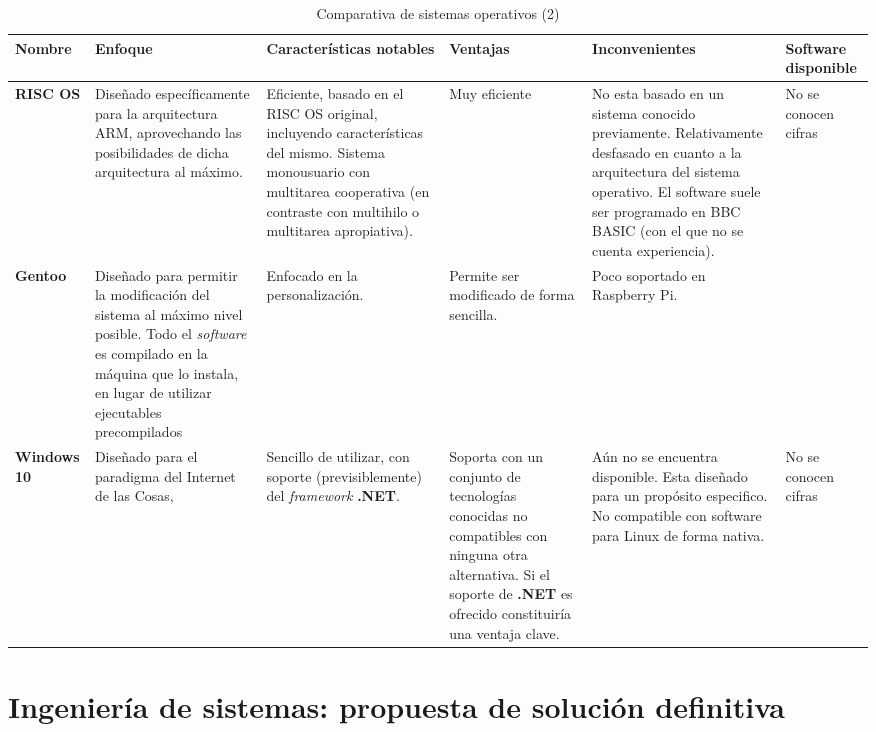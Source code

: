 \begin{landscape}
\begin{table}[h]
\begin{tabular}{|p{2cm}|p{4cm}|p{5cm}|p{3cm}|p{4cm}|p{4cm}|}
\hline
\textbf{Nombre} & \textbf{Enfoque} & \textbf{Características notables} & \textbf{Ventajas} & \textbf{Inconvenientes} & \textbf{Software disponible}\\ \hline

\textbf{RISC OS} & Diseñado específicamente para la arquitectura ARM, aprovechando las posibilidades de dicha arquitectura al máximo. & Eficiente, basado en el RISC OS original, incluyendo características del mismo. Sistema monousuario con multitarea cooperativa (en contraste con multihilo o multitarea apropiativa). & Muy eficiente & No esta basado en un sistema conocido previamente. Relativamente desfasado en cuanto a la arquitectura del sistema operativo. El software suele ser programado en BBC BASIC (con el que no se cuenta experiencia). & No se conocen cifras\\ \hline

\textbf{Gentoo} & Diseñado para permitir la modificación del sistema al máximo nivel posible. Todo el \textit{software} es compilado en la máquina que lo instala, en lugar de utilizar ejecutables precompilados & Enfocado en la personalización. & Permite ser modificado de forma sencilla. & Poco soportado en Raspberry Pi. & \\ \hline

\textbf{Windows 10} & Diseñado para el paradigma del Internet de las Cosas, & Sencillo de utilizar, con soporte (previsiblemente) del \textit{framework} \textbf{.NET}. & Soporta con un conjunto de tecnologías conocidas no compatibles con ninguna otra alternativa. Si el soporte de \textbf{.NET} es ofrecido constituiría una ventaja clave.  & Aún no se encuentra disponible\cite{windows10raspberry}. Esta diseñado para un propósito especifico. No compatible con software para Linux de forma nativa. & No se conocen cifras\\ \hline

\end{tabular}
\caption{Comparativa de sistemas operativos (2)}
\end{table}
\end{landscape}


\section{Ingeniería de sistemas: propuesta de solución definitiva}

